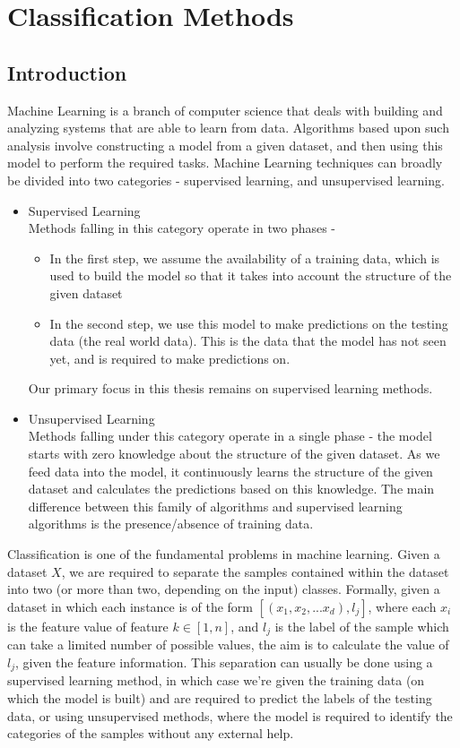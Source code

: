 \chapter{Classification Methods}
\label{chapter:Classification Methods}

\section{Introduction}
Machine Learning is a branch of computer science that deals with building and analyzing systems that are able to learn from data. Algorithms based upon such analysis involve constructing a model from a given dataset, and then using this model to perform the required tasks. Machine Learning techniques can broadly be divided into two categories - supervised learning, and unsupervised learning.
\begin{itemize}
    \item{
    Supervised Learning\\
    Methods falling in this category operate in two phases -
    \begin{itemize}
        \item{In the first step, we assume the availability of a training data, which is used to build the model so that it takes into account the structure of the given dataset}
        \item{In the second step, we use this model to make predictions on the testing data (the real world data). This is the data that the model has not seen yet, and is required to make predictions on.}
    \end{itemize}
    Our primary focus in this thesis remains on supervised learning methods.
    }
    \item{
    Unsupervised Learning\\
    Methods falling under this category operate in a single phase - the model starts with zero knowledge about the structure of the given dataset. As we feed data into the model, it continuously learns the structure of the given dataset and calculates the predictions based on this knowledge. The main difference between this family of algorithms and supervised learning algorithms is the presence/absence of training data.
    }
\end{itemize}
Classification is one of the fundamental problems in machine learning. Given a dataset $X$, we are required to separate the samples contained within the dataset into two (or more than two, depending on the input) classes. Formally, given a dataset in which each instance is of the form $[(x_1, x_2, ... x_d), l_j]$, where each $x_i$ is the feature value of feature $k \in [1, n]$, and $l_j$ is the label of the sample which can take a limited number of possible values, the aim is to calculate the value of $l_j$, given the feature information. This separation can usually be done using a supervised learning method, in which case we're given the training data (on which the model is built) and are required to predict the labels of the testing data, or using unsupervised methods, where the model is required to identify the categories of the samples without any external help.

